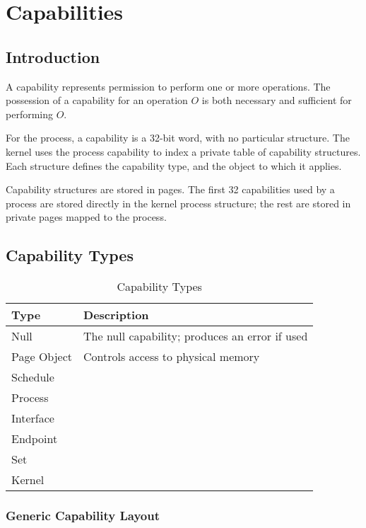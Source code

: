 \chapter{Capabilities}

\section{Introduction}

A capability represents permission to perform one or more operations.  The possession of a capability for an operation $O$ is both necessary and sufficient for performing $O$.

For the process, a capability is a 32-bit word, with no particular structure.  The kernel uses the process capability to index a private table of capability structures.  Each structure defines the capability type, and the object to which it applies.

Capability structures are stored in pages.  The first 32 capabilities used by a process are stored directly in the kernel process structure; the rest are stored in private pages mapped to the process.

\section{Capability Types}

\begin{table}[ht]
\begin{tabular}{l l}
\hline\hline
Type & Description \\
\hline
Null            &  The null capability; produces an error if used \\
Page Object     &  Controls access to physical memory \\
Schedule        &  \\
Process         &  \\
Interface       &  \\
Endpoint        &  \\
Set             &  \\
Kernel          &  \\
\hline
\end{tabular}
\caption{Capability Types}
\label{table:captypes}
\end{table}

\subsection{Generic Capability Layout}

